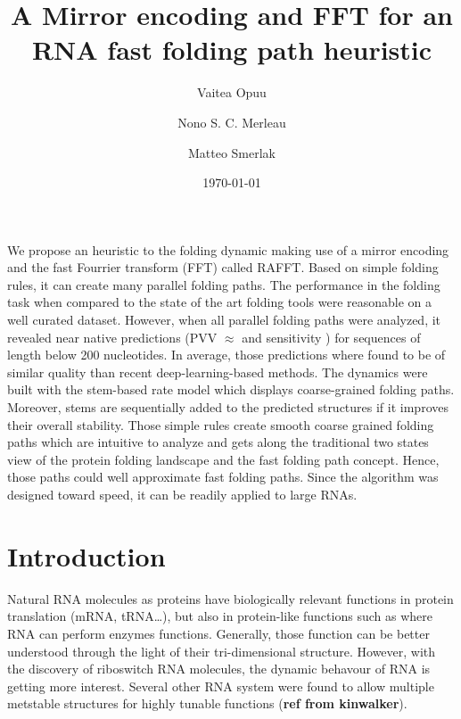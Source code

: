\documentclass[a4paper,12pt]{article}
\author[1]{Vaitea Opuu}
\author[1]{Nono S. C. Merleau}
\author[1]{Matteo Smerlak}
\affil[1]{Max Planck Institute for Mathematics in the Sciences, D-04103 Leipzig, Germany}
\date{\today}
\title{A Mirror encoding and FFT for an RNA fast folding path heuristic}
\begin{document}
\maketitle
We propose an heuristic to the folding dynamic making use of a mirror encoding
and the fast Fourrier transform (FFT) called RAFFT. Based on simple folding
rules, it can create many parallel folding paths. The performance in the folding
task when compared to the state of the art folding tools were reasonable on a
well curated dataset. However, when all parallel folding paths were analyzed, it
revealed near native predictions (PVV \(\approx\) and sensitivity ) for sequences of
length below 200 nucleotides. In average, those predictions where found to be of
similar quality than recent deep-learning-based methods. The dynamics were built
with the stem-based rate model which displays coarse-grained folding paths.
Moreover, stems are sequentially added to the predicted structures if it
improves their overall stability. Those simple rules create smooth coarse
grained folding paths which are intuitive to analyze and gets along the
traditional two states view of the protein folding landscape and the fast
folding path concept. Hence, those paths could well approximate fast folding
paths. Since the algorithm was designed toward speed, it can be readily applied
to large RNAs.

\section{Introduction}
\label{sec:orgc76b153}
Natural RNA molecules as proteins have biologically relevant functions in
protein translation (mRNA, tRNA\ldots{}), but also in protein-like functions such as
where RNA can perform enzymes functions. Generally, those function can be better
understood through the light of their tri-dimensional structure. However, with
the discovery of riboswitch RNA molecules, the dynamic behavour of RNA is
getting more interest. Several other RNA system were found to allow multiple
metstable structures for highly tunable functions (\textbf{ref from kinwalker}).
\end{document}
